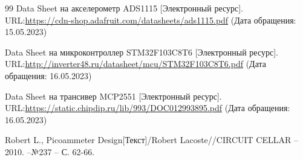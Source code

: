 \newpage
\renewcommand\refname{\centering СПИСОК ИСПОЛЬЗОВАННЫХ ИСТОЧНИКОВ}
\begin {thebibliography} {99}
Data Sheet на акселерометр ADS1115  [Электронный ресурс]. URL:\href{https://cdn-shop.adafruit.com/datasheets/ads1115.pdf}{https://cdn-shop.adafruit.com/datasheets/ads1115.pdf} (Дата обращения: 15.05.2023)


Data Sheet на микроконтроллер STM32F103C8T6  [Электронный ресурс]. URL:\href{http://inverter48.ru/datasheet/mcu/STM32F103C8T6.pdf}{http://inverter48.ru/datasheet/mcu/STM32F103C8T6.pdf} (Дата обращения: 16.05.2023)


Data Sheet на трансивер MCP2551  [Электронный ресурс]. URL:\href{https://static.chipdip.ru/lib/993/DOC012993895.pdf}{https://static.chipdip.ru/lib/993/DOC012993895.pdf} (Дата обращения: 16.05.2023)





Robert L., Picoammeter Design[Текст]/Robert Lacoste//CIRCUIT CELLAR --2010. --№237 -- С. 62-66.




\end {thebibliography}



